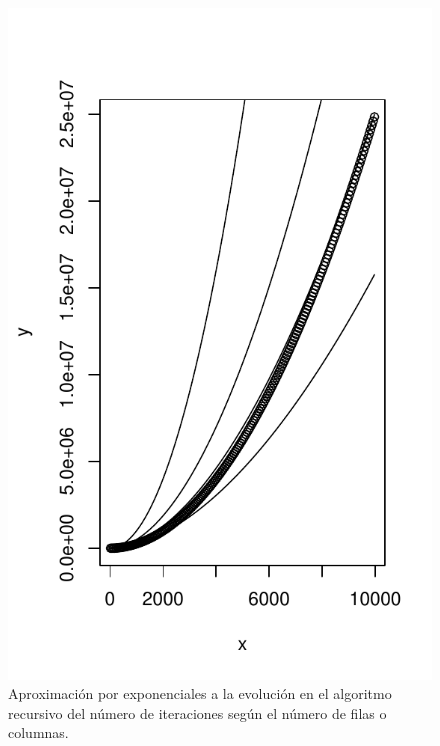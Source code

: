 \documentclass[12pt,a4paper]{article}
\begin{document}
\begin{figure}[h]
	\centering
	\includegraphics[scale=0.9]{fotos/iterations_rec_vs_pows}
	\caption{Aproximación por exponenciales a la evolución en el algoritmo recursivo del número de iteraciones según el número de filas o columnas.}
	\label{grafico3}
\end{figure}
\end{document}
